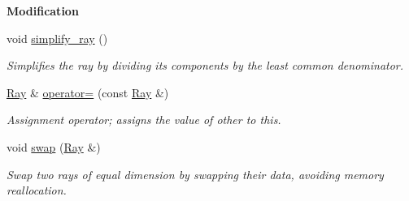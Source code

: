 \begin{Indent}\textbf{ Modification}\par
\begin{DoxyCompactItemize}
\item 
\mbox{\label{group___c_l_s_solvers_ac25d6feac8d47548fc157b6e3e8f26cc}} 
void \hyperlink{group___c_l_s_solvers_ac25d6feac8d47548fc157b6e3e8f26cc}{simplify\+\_\+ray} ()
\begin{DoxyCompactList}\small\item\em Simplifies the ray by dividing its components by the least common denominator. \end{DoxyCompactList}\item 
\hyperlink{group___c_l_s_solvers_class_l_p___solvers_1_1_ray}{Ray} \& \hyperlink{group___c_l_s_solvers_ae70a9ad73b8788c53e0b1cc7c2cdae27}{operator=} (const \hyperlink{group___c_l_s_solvers_class_l_p___solvers_1_1_ray}{Ray} \&)
\begin{DoxyCompactList}\small\item\em Assignment operator; assigns the value of {\ttfamily other} to {\ttfamily this}. \end{DoxyCompactList}\item 
void \hyperlink{group___c_l_s_solvers_acea89ef5df0792e64ce9003ad19913d4}{swap} (\hyperlink{group___c_l_s_solvers_class_l_p___solvers_1_1_ray}{Ray} \&)
\begin{DoxyCompactList}\small\item\em Swap two rays of equal dimension by swapping their data, avoiding memory reallocation. \end{DoxyCompactList}\end{DoxyCompactItemize}
\end{Indent}
